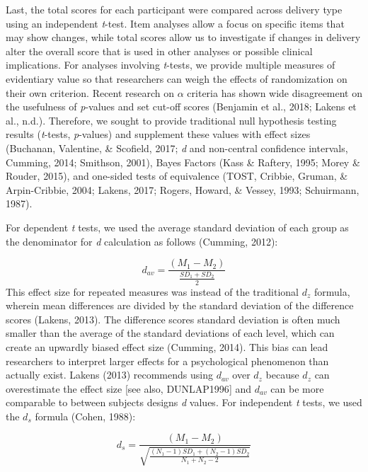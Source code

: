 \documentclass[english,man, mask]{apa6}
\theoremstyle{definition}
\theoremstyle{definition}
\theoremstyle{definition}
\theoremstyle{remark}
\begin{document}
Last, the total scores for each participant were compared across
delivery type using an independent \emph{t}-test. Item analyses allow a
focus on specific items that may show changes, while total scores allow
us to investigate if changes in delivery alter the overall score that is
used in other analyses or possible clinical implications. For analyses
involving \emph{t}-tests, we provide multiple measures of evidentiary
value so that researchers can weigh the effects of randomization on
their own criterion. Recent research on \(\alpha\) criteria has shown
wide disagreement on the usefulness of \emph{p}-values and set cut-off
scores (Benjamin et al., 2018; Lakens et al., n.d.). Therefore, we
sought to provide traditional null hypothesis testing results
(\emph{t}-tests, \emph{p}-values) and supplement these values with
effect sizes (Buchanan, Valentine, \& Scofield, 2017; \emph{d} and
non-central confidence intervals, Cumming, 2014; Smithson, 2001), Bayes
Factors (Kass \& Raftery, 1995; Morey \& Rouder, 2015), and one-sided
tests of equivalence (TOST, Cribbie, Gruman, \& Arpin-Cribbie, 2004;
Lakens, 2017; Rogers, Howard, \& Vessey, 1993; Schuirmann, 1987).

For dependent \emph{t} tests, we used the average standard deviation of
each group as the denominator for \emph{d} calculation as follows
(Cumming, 2012):

\[
d_{av} = \frac {(M_1 -  M_2) } { \frac{SD_1 + SD_2 } {2} }
\] This effect size for repeated measures was instead of the traditional
\(d_z\) formula, wherein mean differences are divided by the standard
deviation of the difference scores (Lakens, 2013). The difference scores
standard deviation is often much smaller than the average of the
standard deviations of each level, which can create an upwardly biased
effect size (Cumming, 2014). This bias can lead researchers to interpret
larger effects for a psychological phenomenon than actually exist.
Lakens (2013) recommends using \(d_{av}\) over \(d_z\) because \(d_z\)
can overestimate the effect size {[}see also, DUNLAP1996{]} and
\(d_{av}\) can be more comparable to between subjects designs \emph{d}
values. For independent \emph{t} tests, we used the \(d_s\) formula
(Cohen, 1988):

\[
d_s = \frac {(M_1 -  M_2) } { \sqrt{\frac{(N_1-1)SD_1 + (N_2-1)SD_2 } {N_1+N_2-2}} }
\]
\end{document}

